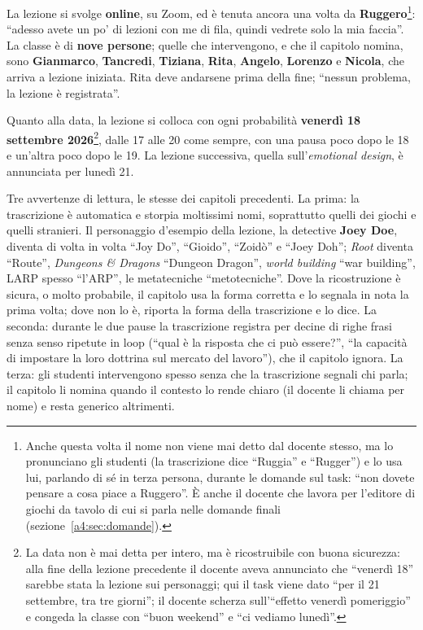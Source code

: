La lezione si svolge \textbf{online}, su Zoom, ed è tenuta ancora una volta da
\textbf{Ruggero}\footnote{Anche questa volta il nome non viene mai detto dal
docente stesso, ma lo pronunciano gli studenti (la trascrizione dice ``Ruggia'' e
``Rugger'') e lo usa lui, parlando di sé in terza persona, durante le domande sul
task: ``non dovete pensare a cosa piace a Ruggero''. È anche il docente che
lavora per l'editore di giochi da tavolo di cui si parla nelle domande finali
(sezione~\ref{a4:sec:domande}).}: ``adesso avete un po' di lezioni con me di fila,
quindi vedrete solo la mia faccia''. La classe è di \textbf{nove persone}; quelle
che intervengono, e che il capitolo nomina, sono \textbf{Gianmarco},
\textbf{Tancredi}, \textbf{Tiziana}, \textbf{Rita}, \textbf{Angelo},
\textbf{Lorenzo} e \textbf{Nicola}, che arriva a lezione iniziata. Rita deve
andarsene prima della fine; ``nessun problema, la lezione è registrata''.

Quanto alla data, la lezione si colloca con ogni probabilità \textbf{venerdì 18
settembre 2026}\footnote{La data non è mai detta per intero, ma è ricostruibile
con buona sicurezza: alla fine della lezione precedente il docente aveva
annunciato che ``venerdì 18'' sarebbe stata la lezione sui personaggi; qui il
task viene dato ``per il 21 settembre, tra tre giorni''; il docente scherza
sull'``effetto venerdì pomeriggio'' e congeda la classe con ``buon weekend'' e
``ci vediamo lunedì''.}, dalle 17 alle 20 come sempre, con una pausa poco dopo le
18 e un'altra poco dopo le 19. La lezione successiva, quella sull'\emph{emotional
design}, è annunciata per lunedì 21.

Tre avvertenze di lettura, le stesse dei capitoli precedenti. La prima: la
trascrizione è automatica e storpia moltissimi nomi, soprattutto quelli dei
giochi e quelli stranieri. Il personaggio d'esempio della lezione, la detective
\textbf{Joey Doe}, diventa di volta in volta ``Joy Do'', ``Gioido'', ``Zoidò'' e
``Joey Doh''; \emph{Root} diventa ``Route'', \emph{Dungeons \& Dragons}
``Dungeon Dragon'', \emph{world building} ``war building'', LARP spesso
``l'ARP'', le metatecniche ``metotecniche''. Dove la ricostruzione è sicura, o
molto probabile, il capitolo usa la forma corretta e lo segnala in nota la prima
volta; dove non lo è, riporta la forma della trascrizione e lo dice. La seconda:
durante le due pause la trascrizione registra per decine di righe frasi senza
senso ripetute in loop (``qual è la risposta che ci può essere?'', ``la capacità
di impostare la loro dottrina sul mercato del lavoro''), che il capitolo ignora.
La terza: gli studenti intervengono spesso senza che la trascrizione segnali chi
parla; il capitolo li nomina quando il contesto lo rende chiaro (il docente li
chiama per nome) e resta generico altrimenti.

